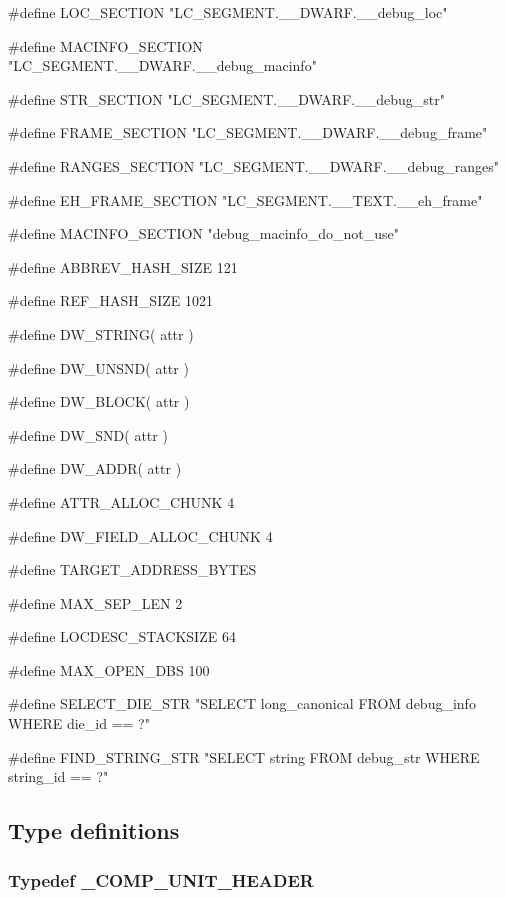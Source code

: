 \medskip
{\stt \#define LOC\_SECTION "LC\_SEGMENT.\_\_DWARF.\_\_debug\_loc"}

\medskip
{\stt \#define MACINFO\_SECTION "LC\_SEGMENT.\_\_DWARF.\_\_debug\_macinfo"}

\medskip
{\stt \#define STR\_SECTION "LC\_SEGMENT.\_\_DWARF.\_\_debug\_str"}

\medskip
{\stt \#define FRAME\_SECTION "LC\_SEGMENT.\_\_DWARF.\_\_debug\_frame"}

\medskip
{\stt \#define RANGES\_SECTION "LC\_SEGMENT.\_\_DWARF.\_\_debug\_ranges"}

\medskip
{\stt \#define EH\_FRAME\_SECTION "LC\_SEGMENT.\_\_TEXT.\_\_eh\_frame"}

\medskip
{\stt \#define MACINFO\_SECTION "debug\_macinfo\_do\_not\_use"}

\medskip
{\stt \#define ABBREV\_HASH\_SIZE 121}

\medskip
{\stt \#define REF\_HASH\_SIZE 1021}

\medskip
{\stt \#define DW\_STRING( attr )}

\medskip
{\stt \#define DW\_UNSND( attr )}

\medskip
{\stt \#define DW\_BLOCK( attr )}

\medskip
{\stt \#define DW\_SND( attr )}

\medskip
{\stt \#define DW\_ADDR( attr )}

\medskip
{\stt \#define ATTR\_ALLOC\_CHUNK 4}

\medskip
{\stt \#define DW\_FIELD\_ALLOC\_CHUNK 4}

\medskip
{\stt \#define TARGET\_ADDRESS\_BYTES}

\medskip
{\stt \#define MAX\_SEP\_LEN 2}

\medskip
{\stt \#define LOCDESC\_STACKSIZE 64}

\medskip
{\stt \#define MAX\_OPEN\_DBS 100}

\medskip
{\stt \#define SELECT\_DIE\_STR "SELECT long\_canonical FROM debug\_info WHERE die\_id == ?"}

\medskip
{\stt \#define FIND\_STRING\_STR "SELECT string FROM debug\_str WHERE string\_id == ?"}


\subsection{Type definitions}


\subsubsection{Typedef \_COMP\_UNIT\_HEADER}
\label{type__COMP_UNIT_HEADER_dwarf2read.c}

